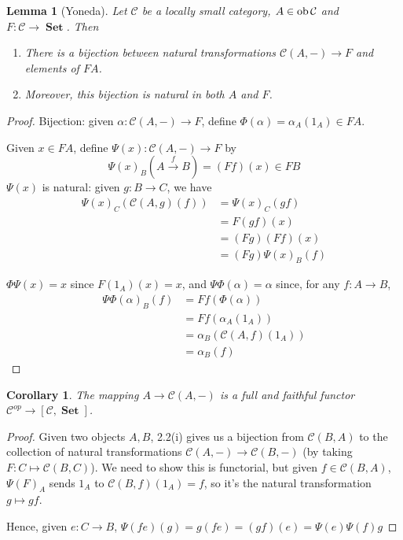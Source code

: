 \documentclass[a4paper]{article}
\newtheorem{lemma}[definition]{Lemma}
\newtheorem{corollary}[definition]{Corollary}
\numberwithin{definition}{section}
\newcommand*\ob[1]{\textnormal{ob}\,#1}
\DeclareMathOperator{\Set}{\textbf{Set}}
\begin{document}
\begin{lemma}[Yoneda]
	Let $\mathcal{C}$ be a locally small category, $A \in \ob \mathcal{C}$ and $F: \mathcal{C} \to \Set$. Then
	\begin{enumerate}[label=\roman*.]
		\item There is a bijection between natural transformations $\mathcal{C}(A, -) \to F$ and elements of $FA$.
		\item Moreover, this bijection is natural in both $A$ and $F$.
	\end{enumerate}
\end{lemma}
\begin{proof}
	Bijection: given $\alpha : \mathcal{C}(A, -) \to F$, define $\Phi(\alpha) = \alpha_A(1_A) \in FA$.
	
	Given $x \in FA$, define $\Psi(x): \mathcal{C}(A, -) \to F$ by $$\Psi(x)_B(A \overset{f}{\to} B) = (Ff)(x) \in FB$$ $\Psi(x)$ is natural: given $g: B \to C$, we have
	\begin{align*}
	\Psi(x)_C(\mathcal{C}(A, g)(f)) &= \Psi(x)_C(gf) \\
	&= F(gf)(x) \\
	&= (Fg)(Ff)(x) \\
	&= (Fg)\Psi(x)_B(f)
	\end{align*}
	
	$\Phi\Psi(x) = x$ since $F(1_A)(x) = x$, and $\Psi\Phi(\alpha) = \alpha$ since, for any $f: A \to B$,
	\begin{align*}
	\Psi\Phi(\alpha)_B(f) &= Ff(\Phi(\alpha)) \\
	&= Ff(\alpha_A(1_A)) \\
	&= \alpha_B(\mathcal{C}(A,f)(1_A)) \\
	&= \alpha_B(f)
	\end{align*}
\end{proof}

\begin{corollary}
	The mapping $A \to \mathcal{C}(A, -)$ is a full and faithful functor $\mathcal{C}^{op} \to [\mathcal{C}, \Set]$.
\end{corollary}
\begin{proof}
	Given two objects $A,B$, 2.2(i) gives us a bijection from $\mathcal{C}(B,A)$ to the collection of natural transformations $\mathcal{C}(A, -) \to \mathcal{C}(B, -)$ (by taking $F: C \mapsto \mathcal{C}(B, C)$).
	We need to show this is functorial, but given $f \in \mathcal{C}(B, A)$, $\Psi(F)_A$ sends $1_A$ to $\mathcal{C}(B, f)(1_A) = f$, so it's the natural transformation $g \mapsto gf$.
	
	Hence, given $e: C \to B$, $\Psi(fe)(g) = g(fe) = (gf)(e) = \Psi(e)\Psi(f)g$
\end{proof}
\end{document}

